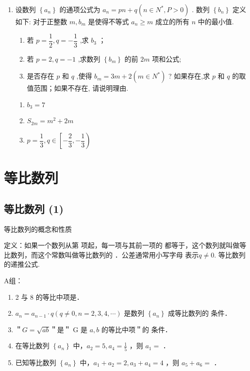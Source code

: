 \begin{enumerate}
    \item 设数列 $\left\{  {a}_{n}\right\}$ 的通项公式为 ${a}_{n} = {pn} + q\left( {n \in  {N}^{ * },P > 0}\right)$ . 数列 $\left\{  {b}_{n}\right\}$ 定义如下: 对于正整数 $m,{b}_{m}$ 是使得不等式 ${a}_{n} \geq  m$ 成立的所有 $n$ 中的最小值.
    \begin{enumerate}
        \item 若 $p = \dfrac{1}{2},q =  - \dfrac{1}{3}$ ,求 ${b}_{3}$ ；
        \item 若 $p = 2,q =  - 1$ ,求数列 $\left\{  {b}_{m}\right\}$ 的前 ${2m}$ 项和公式;
        \item 是否存在 $p$ 和 $q$ ,使得 ${b}_{m} = {3m} + 2\left( {m \in  {N}^{ * }}\right)$ ? 如果存在,求 $p$ 和 $q$ 的取值范围；如果不存在, 请说明理由.
    \end{enumerate}
    \begin{jieda}
        \begin{enumerate}
            \item ${b}_{3} = 7$
            \item ${S}_{2m} = {m}^{2} + {2m}$
            \item $p = \dfrac{1}{3},q \in  \left\lbrack  {-\dfrac{2}{3}, - \dfrac{1}{3}}\right)$
        \end{enumerate}
    \end{jieda}
\end{enumerate}


\section*{等比数列}
\subsection*{等比数列 (1)}
\zsd 等比数列的概念和性质


定义：如果一个数列从第 项起，每一项与其前一项的  都等于，这个数列就叫做等比数列，而这个常数叫做等比数列的   ．公差通常用小写字母  表示$q\neq 0$. 等比数列的递推公式.

A组：
\begin{enumerate}
    \item 2 与 8 的等比中项是．
    
    \item $a_n=a_{n-1} \cdot q(q \neq 0, n=2,3,4, \cdots)$ 是数列 $\left\{a_n\right\}$ 成等比数列的 条件．
    
    \item ＂$G=\sqrt{a b}$＂是＂ G 是 $a, b$ 的等比中项＂的 条件． 
    
    \item 在等比数列 $\left\{a_n\right\}$ 中，$a_2=5, a_4=\frac{1}{5}$ ，则 $a_1=$ ．
    
    \item 已知等比数列 $\left\{a_n\right\}$ 中，$a_1+a_2=2, a_3+a_4=4$ ，则 $a_5+a_6=$   ．
    
\end{enumerate}

